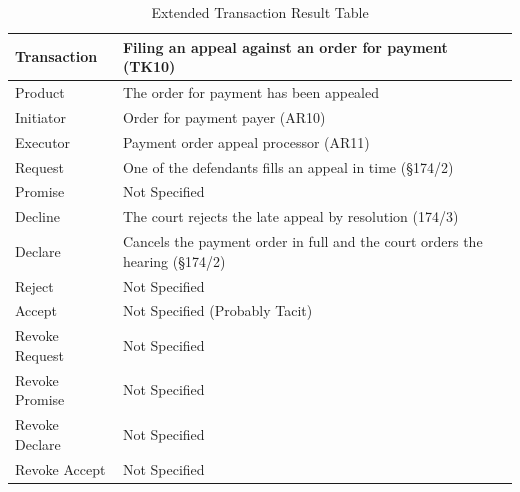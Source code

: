 \begin{landscape}
\begin{table}[h]
\caption{Extended Transaction Result Table}
\label{tab:etrt}
\begin{tabular}{|l||l|l|}
\hline
Transaction  &  Filing an appeal against an order for payment (TK10) \\ \hline
Product      &  The order for payment has been appealed \\ \hline
Initiator      &  Order for payment payer (AR10)  \\ \hline
Executor       &  Payment order appeal processor (AR11) \\ \hline
Request        & One of the defendants fills an appeal in time (\S174/2)
  \\ \hline
Promise        &    Not Specified   \\ \hline
Decline        & The court rejects the late appeal by resolution (174/3)  \\ \hline
Declare        &  Cancels the payment order in full and the court orders the hearing (\S174/2)  \\ \hline
Reject         &  Not Specified   \\ \hline
Accept         & Not Specified (Probably Tacit) \\ \hline
Revoke Request & Not Specified \\ \hline
Revoke Promise & Not Specified  \\ \hline
Revoke Declare & Not Specified      \\ \hline
Revoke Accept  &  Not Specified \\ \hline
\end{tabular}
\end{table}


\end{landscape}
